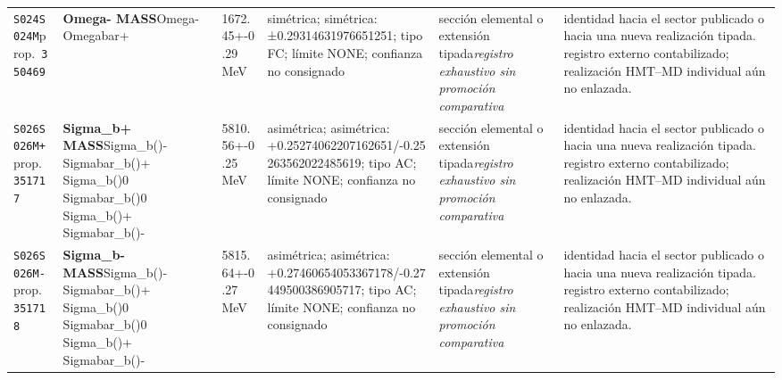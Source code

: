 \begin{landscape}
\begin{longtable}{L{1.85cm}L{4.45cm}L{2.35cm}L{4.05cm}L{3.35cm}L{7.15cm}}
\texttt{S024}\newline \texttt{S024M}\newline prop.\ \texttt{350469} & \textbf{Omega- MASS}\newline Omega- \textbar{}\allowbreak{} Omegabar+ & 1672.45+-0.29\,MeV & simétrica; simétrica: ±0.29314631976651251; tipo FC; límite NONE; confianza no consignado & sección elemental o extensión tipada\newline \emph{registro exhaustivo sin promoción comparativa} & identidad hacia el sector publicado o hacia una nueva realización tipada. registro externo contabilizado; realización HMT--MD individual aún no enlazada. \\
\texttt{S026}\newline \texttt{S026M+}\newline prop.\ \texttt{351717} & \textbf{Sigma\_\allowbreak{}b+ MASS}\newline Sigma\_\allowbreak{}b()- \textbar{}\allowbreak{} Sigmabar\_\allowbreak{}b()+ \textbar{}\allowbreak{} Sigma\_\allowbreak{}b()0 \textbar{}\allowbreak{} Sigmabar\_\allowbreak{}b()0 \textbar{}\allowbreak{} Sigma\_\allowbreak{}b()+ \textbar{}\allowbreak{} Sigmabar\_\allowbreak{}b()- & 5810.56+-0.25\,MeV & asimétrica; asimétrica: +0.25274062207162651/-0.25263562022485619; tipo AC; límite NONE; confianza no consignado & sección elemental o extensión tipada\newline \emph{registro exhaustivo sin promoción comparativa} & identidad hacia el sector publicado o hacia una nueva realización tipada. registro externo contabilizado; realización HMT--MD individual aún no enlazada. \\
\texttt{S026}\newline \texttt{S026M-}\newline prop.\ \texttt{351718} & \textbf{Sigma\_\allowbreak{}b- MASS}\newline Sigma\_\allowbreak{}b()- \textbar{}\allowbreak{} Sigmabar\_\allowbreak{}b()+ \textbar{}\allowbreak{} Sigma\_\allowbreak{}b()0 \textbar{}\allowbreak{} Sigmabar\_\allowbreak{}b()0 \textbar{}\allowbreak{} Sigma\_\allowbreak{}b()+ \textbar{}\allowbreak{} Sigmabar\_\allowbreak{}b()- & 5815.64+-0.27\,MeV & asimétrica; asimétrica: +0.27460654053367178/-0.27449500386905717; tipo AC; límite NONE; confianza no consignado & sección elemental o extensión tipada\newline \emph{registro exhaustivo sin promoción comparativa} & identidad hacia el sector publicado o hacia una nueva realización tipada. registro externo contabilizado; realización HMT--MD individual aún no enlazada. \\

\end{longtable}
\end{landscape}
